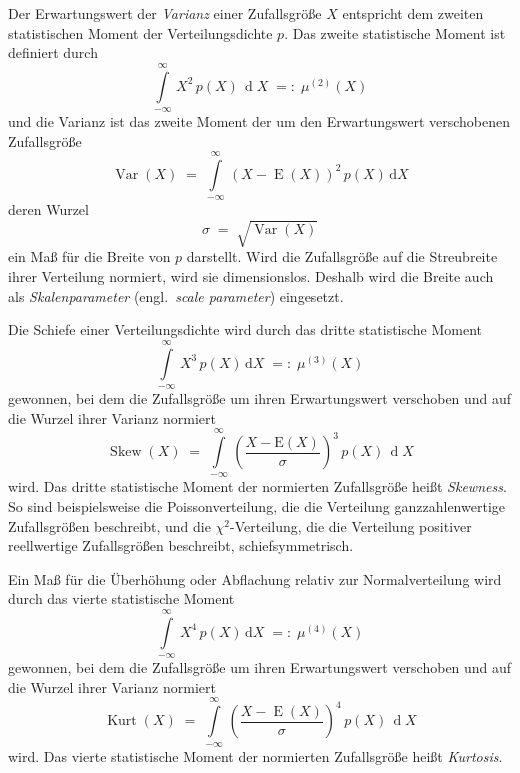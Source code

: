 Der Erwartungswert der \textsl{Varianz}
einer Zufallsgröße $X$ entspricht dem zweiten statistischen Moment
der Verteilungsdichte $p$.
Das zweite statistische Moment ist definiert durch
\begin{equation}
\int\limits_{-\infty}^{\infty} \, X^2 \, p(X) \, \operatorname{d} X \; =: \; \mu^{(2)}(X)
\end{equation}
und die Varianz ist das zweite Moment der um den Erwartungswert verschobenen Zufallsgröße
\begin{equation}
\operatorname{Var}(X) \; = \; \int\limits_{-\infty}^{\infty} \, (X - \operatorname{E}(X))^2 \,
 p(X) \, \mathrm{d} X
\end{equation}
deren Wurzel
\begin{equation}
\sigma \; = \; \sqrt{\operatorname{Var}(X)}
\end{equation}
ein Maß für die Breite von $p$ darstellt. Wird die Zufallsgröße auf die Streubreite ihrer
Verteilung normiert, wird sie dimensionslos. Deshalb wird die Breite auch als \textsl{Skalenparameter}
(engl.\ \textsl{scale parameter}) eingesetzt.

Die Schiefe einer Verteilungsdichte wird durch das dritte statistische Moment
\begin{equation}
\int\limits_{-\infty}^{\infty} \, X^3 \, p(X) \, \mathrm{d} X \; =: \; \mu^{(3)}(X)
\end{equation}
gewonnen, bei dem die Zufallsgröße um ihren Erwartungswert verschoben und auf die Wurzel ihrer
Varianz normiert
\begin{equation}
\operatorname{Skew}(X) \; = \; \int\limits_{-\infty}^{\infty} \, \left(\frac{X - \mathrm{E}(X)}{\sigma}
\right)^3 \, p(X) \, \operatorname{d} X
\end{equation}
wird. Das dritte statistische Moment der normierten Zufallsgröße heißt
\textsl{Skewness}.
So sind beispielsweise die Poissonverteilung, die die Verteilung ganzzahlenwertige Zufallsgrößen beschreibt,
und die $\chi^2$-Verteilung, die die Verteilung positiver reellwertige Zufallsgrößen beschreibt,
schiefsymmetrisch.

Ein Maß für die Überhöhung oder Abflachung relativ zur Normalverteilung wird durch
das vierte statistische Moment
\begin{equation}
\int\limits_{-\infty}^{\infty} \, X^4 \, p(X) \, \mathrm{d} X \; =: \; \mu^{(4)}(X)
\end{equation}
gewonnen, bei dem die Zufallsgröße um ihren Erwartungswert verschoben und auf die Wurzel ihrer
Varianz normiert
\begin{equation}
\operatorname{Kurt}(X) \; = \;  \int\limits_{-\infty}^{\infty} \, \left(\frac{X - \operatorname{E}(X)}{\sigma}
\right)^4 \, p(X) \, \operatorname{d} X
\end{equation}
wird. Das vierte statistische Moment der normierten Zufallsgröße heißt
\textsl{Kurtosis}.

